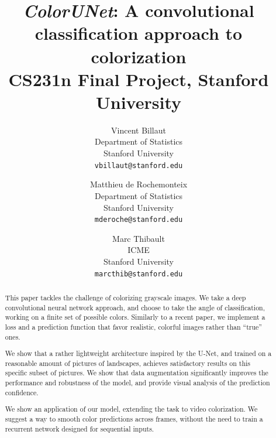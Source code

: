 \documentclass[10pt,twocolumn,letterpaper]{article}
\begin{document}
\title{\textit{ColorUNet}: A convolutional classification approach to colorization \\[.2in] \normalsize CS231n Final Project, Stanford University}

\author{Vincent Billaut\\
Department of Statistics\\
Stanford University\\
{\tt\small vbillaut@stanford.edu}
\and
Matthieu de Rochemonteix\\
Department of Statistics\\
Stanford University\\
{\tt\small mderoche@stanford.edu}
\and
Marc Thibault\\
ICME\\
Stanford University\\
{\tt\small marcthib@stanford.edu}
}

\maketitle



\begin{abstract}
This paper tackles the challenge of colorizing grayscale images. We take a deep convolutional neural network approach, and choose to take the angle of classification, working on a finite set of possible colors. Similarly to a recent paper, we implement a loss and a prediction function that favor realistic, colorful images rather than ``true'' ones.

We show that a rather lightweight architecture inspired by the U-Net, and trained on a reasonable amount of pictures of landscapes, achieves satisfactory results on this specific subset of pictures. We show that data augmentation significantly improves the performance and robustness of the model, and provide visual analysis of the prediction confidence.

We show an application of our model, extending the task to video colorization. We suggest a way to smooth color predictions across frames, without the need to train a recurrent network designed for sequential inputs.

\end{abstract}
\end{document}
